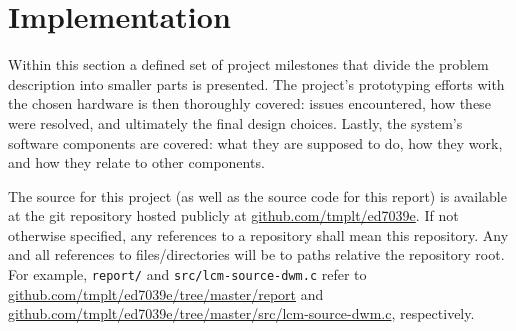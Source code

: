 \section{Implementation}
\label{sec:impl}
Within this section a defined set of project milestones that divide the problem description into smaller parts is presented.
The project's prototyping efforts with the chosen hardware is then thoroughly covered:
issues encountered, how these were resolved, and ultimately the final design choices.
Lastly, the system's software components are covered: what they are supposed to do, how they work, and how they relate to other components.

The source for this project (as well as the source code for this report) is available at the git repository hosted publicly at \href{https://github.com/tmplt/ed7039e}{github.com/tmplt/ed7039e}.
If not otherwise specified, any references to a repository shall mean this repository.
Any and all references to files/directories will be to paths relative the repository root.
For example, \texttt{report/} and \texttt{src/lcm-source-dwm.c} refer to \href{https://github.com/tmplt/ed7039e/tree/master/report}{github.com/tmplt/ed7039e/tree/master/report} and \href{https://github.com/tmplt/ed7039e/tree/master/src/lcm-source-dwm.c}{github.com/tmplt/ed7039e/tree/master/src/lcm-source-dwm.c}, respectively.


